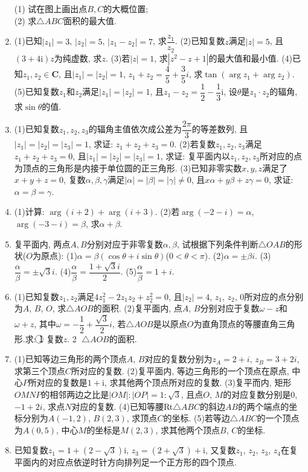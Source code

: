 \documentclass[10pt,a4paper]{article}
\begin{document}
\begin{enumerate}[1.]
(1) 试在图上画出点$B,C$的大概位置;\\
(2) 求$\triangle ABC$面积的最大值.
\item (1)已知$|z_1|=3$, $|z_2|=5$, $|z_1-z_2|=7$, 求$\dfrac{z_1}{z_2}$.
(2)已知复数$z$满足$|z|=5$, 且$(3+4\mathrm{i})z$为纯虚数, 求$z$.
(3)若$|z|=1$, 求$|z^2-z+1|$的最大值和最小值.
(4)已知$z_1,z_2\in \mathbf{C}$, 且$|z_1|=|z_2|=1$, $z_1+z_2=\dfrac 45+\dfrac 35i$, 求$\tan (\arg z_1+\arg z_2)$.
(5)已知复数$z_1$和$z_2$满足$|z_1|=|z_2|=1$, 且$z_1-z_2=\dfrac 12-\dfrac 13\mathrm{i}$, 设$\theta$是$z_1\cdot z_2$的辐角, 求$\sin \theta$的值.
\item (1)已知复数$z_1,z_2,z_3$的辐角主值依次成公差为$\dfrac{2\pi }3$的等差数列, 且$|z_1|=|z_2|=|z_3|=1$, 求证: $z_1+z_2+z_3=0$.
(2)若复数$z_1,z_2,z_3$满足$z_1+z_2+z_3=0$, 且$|z_1|=|z_2|=|z_3|=1$, 求证: 复平面内以$z_1,z_2,z_3$所对应的点为顶点的三角形是内接于单位圆的正三角形.
(3)已知非零实数$x,y,z$满足了$x+y+z=0$, 复数$\alpha ,\beta ,\gamma$满足$|\alpha|=|\beta|=|\gamma|\ne 0$, 且$x\alpha +y\beta +z\gamma =0$, 求证: $\alpha =\beta =\gamma$.
\item (1)计算: $\arg (i+2)+\arg (i+3)$.
(2)若$\arg (-2-i)=\alpha$, $\arg (-3-i)=\beta$, 求$\alpha +\beta$.
\item 复平面内, 两点$A,B$分别对应于非零复数$\alpha ,\beta$, 试根据下列条件判断$\triangle OAB$的形状($O$为原点):
(1)$\alpha =\beta (\cos \theta +i\sin \theta)$($0<\theta <\pi$).	(2)$\alpha =\pm \beta i$.
(3)$\dfrac{\alpha }{\beta }=\pm \sqrt 3i$.							(4)$\dfrac{\alpha }{\beta }=\dfrac{1+\sqrt 3i}2$.
(5)$\dfrac{\alpha }{\beta }=1+i$.
\item (1)已知复数$z_1,z_2$满足$4z_1^2-2z_1z_2+z_2^2=0$, 且$|z_2|=4$, $z_1$, $z_2$, 0所对应的点分别为$A$, $B$, $O$, 求$\triangle AOB$的面积.
(2)复平面内, 点$A$, $B$分别对应于复数$\omega -z$和$\omega +z$, 其中$\omega =-\dfrac 12+\dfrac{\sqrt 3}2i$, 若$\triangle AOB$是以原点$O$为直角顶点的等腰直角三角形.求:
\textcircled{1} 复数$z$.							\textcircled{2} $\triangle AOB$的面积.
\item (1)已知等边三角形的两个顶点$A$, $B$对应的复数分别为$z_A=2+i$, $z_B=3+2i$, 求第三个顶点$C$所对应的复数.
(2)复平面内, 等边三角形的一个顶点在原点, 中心$P$所对应的复数是$1+\mathrm{i}$, 求其他两个顶点所对应的复数.
(3)复平而内, 矩形$OMNP$的相邻两边之比是$|OM|:|OP|=1:\sqrt 3$, 且点$O$, $M$的对应复数分别是0, $-1+2i$, 求点$N$对应的复数.
(4)已知等腰Rt$\triangle ABC$的斜边$AB$的两个端点的坐标分别为$A(-1,2)$, $B(2,3)$, 求顶点$C$的坐标.
(5)若等边$\triangle ABC$的一个顶点为$A(0,5)$, 中心$M$的坐标是$M(2,3)$, 求其他两个顶点$B$, $C$的坐标.
\item 已知复数$z_1=1+(2-\sqrt 3)\mathrm{i}$, $z_3=(2+\sqrt 3)+\mathrm{i}$, 又复数$z_1$, $z_2$, $z_3$, $z_4$在复平面内的对应点依逆时针方向排列足一个正方形的四个顶点.

\end{enumerate}
\end{document}
